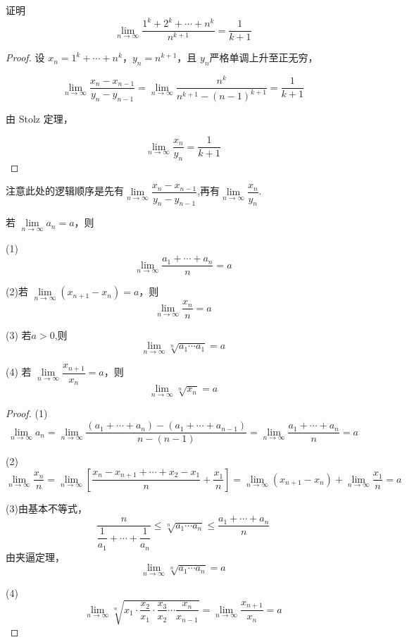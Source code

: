 \begin{example}
	证明
	$$ \lim_{n \to \infty} \dfrac{1^k + 2^k + \cdots + n^k}{n^{k+1}}= \dfrac{1}{k+1} $$
	
\end{example}
\begin{proof}
	设 $x_n = 1^k + \cdots + n^k$，$y_n = n^{k+1}$，且 $y_n $严格单调上升至正无穷，
	
	$$ \lim_{n \to \infty} \frac{x_n - x_{n-1}}{y_n - y_{n-1}} = \lim_{n \to \infty} \frac{n^k}{n^{k+1} - (n-1)^{k+1}} = \frac{1}{k+1} $$
	
	由 Stolz 定理，
	
	$$ \lim_{n \to \infty} \frac{x_n}{y_n} = \frac{1}{k+1} $$
\end{proof}
注意此处的逻辑顺序是先有$\lim\limits_{n \to \infty} \dfrac{x_n - x_{n-1}}{y_n - y_{n-1}}$,再有$\lim\limits_{n \to \infty}\dfrac{x_n}{y_n}$.
\begin{corollary}
	若 $\lim\limits_{n \to \infty} a_n = a$，则
	
	(1)
	$$ \lim_{n \to \infty} \frac{a_1 + \cdots + a_n}{n} = a $$
	
	(2)若 $\lim\limits_{n \to \infty} (x_{n+1} - x_n) = a$，则
	$$ \lim_{n \to \infty} \frac{x_n}{n} = a $$
	
	(3) 若$a>0$,则$$\lim\limits_{n\to\infty}\sqrt[n]{a_1\cdots a_1}=a$$
	
	(4) 若 $\lim\limits_{n \to \infty} \dfrac{x_{n+1}}{x_n} = a$，则
	$$ \lim_{n \to \infty} \sqrt[n]{x_n} = a $$
	\label{imcoofstolz}
\end{corollary}
\begin{proof}
	(1) 
	\[
	\lim_{n \to \infty} a_n = \lim_{n \to \infty} \frac{(a_1 + \cdots + a_n) - (a_1 + \cdots + a_{n-1})}{n - (n-1)} = \lim_{n \to \infty} \frac{a_1 + \cdots + a_n}{n} = a
	\]
	
	(2) \[
	\lim_{n \to \infty} \frac{x_n}{n} = \lim_{n \to \infty} \left[ \frac{x_n - x_{n+1} + \cdots + x_2 - x_1}{n} + \frac{x_1}{n} \right] = \lim_{n \to \infty} (x_{n+1} - x_n) + \lim_{n \to \infty} \frac{x_1}{n} = a
	\]
	
	(3)由基本不等式，
	\[
	\dfrac{n}{\dfrac{1}{a_1} + \cdots + \dfrac{1}{a_n}} \leqslant \sqrt[n]{a_1 \cdots a_n} \leqslant \dfrac{a_1 + \cdots + a_n}{n}
	\]
	由夹逼定理，
	\[
	\lim_{n \to \infty} \sqrt[n]{a_1 \cdots a_n} = a
	\]
	
	
	(4)\[
	\lim_{n \to \infty} \sqrt[n]{x_1 \cdot \frac{x_2}{x_1} \cdot \frac{x_3}{x_2} \cdots \frac{x_n}{x_{n-1}}} = \lim_{n \to \infty} \frac{x_{n+1}}{x_n} = a
	\]
	
\end{proof}


